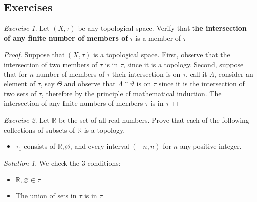 \documentclass[11pt,a4paper,draft]{article}
\theoremstyle{definition}
\theoremstyle{remark}
\newtheorem{exc}{Exercise}
\newtheorem*{sol}{Solution}
\newcommand{\RR}{\mathbb{R}}
\newcommand{\T}{\tau}
\begin{document}
	\subsection*{Exercises}
	\begin{exc}
		Let $ (X,\tau) $ be any topological space. Verify that \textbf{the intersection of any finite number of members of $ \T  $} is a member of $ \T $
	\end{exc}
	\begin{proof}
		Suppose that $ (X,\T) $ is a topological space. First, observe that the intersection of two members of $ \tau $ is in $ \tau $, since it is a topology. Second, suppose that for $ n $ number of members of $ \tau $ their intersection is on $ \tau $, call it $ \varLambda $, consider an element of $ \tau $, say $ \varTheta $ and observe that $ \varLambda \cap \vartheta  $ is on $ \tau $ since it is the intersection of two sets of $ \tau $, therefore by the principle of mathematical induction. The intersection of any finite numbers of members $ \tau $ is in $ \tau $
	\end{proof}
	\begin{exc}
		Let $ \RR $ be the set of all real numbers. Prove that each of the following collections of subsets of $ \RR $ is a topology.
		\begin{itemize}
			\item $ \T_1 $ consists of $ \RR, \varnothing $, and every interval $ (-n,n) $ for $ n $ any positive integer.
		\end{itemize}
	\end{exc}
	\begin{sol}
		We check the 3 conditions:
		\begin{itemize}
			\item $ \RR, \varnothing \in \tau $
			\item The union of sets in $ \tau $ is in $ \tau $
			
			
		\end{itemize}
	\end{sol}
\end{document}
